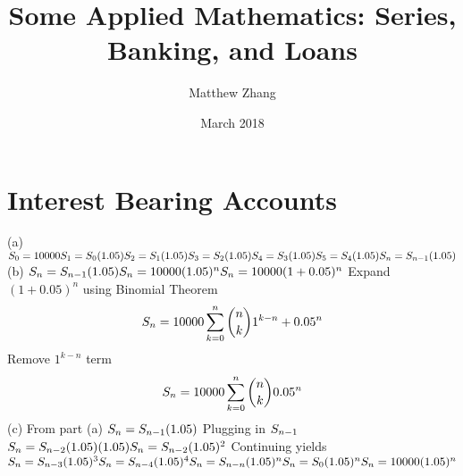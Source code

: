 \documentclass{article}
\title{Some Applied Mathematics: Series, Banking, and Loans}
\author{Matthew Zhang}
\date{March 2018}
\begin{document}
\maketitle


\section*{Interest Bearing Accounts}
(a)\newline
$S_0=10000\newline
S_1= S_0(1.05)\newline
S_2 = S_1(1.05)\newline
S_3 = S_2(1.05)\newline
S_4 = S_3(1.05)\newline
S_5 = S_4(1.05)\newline 
S_n = S_{n-1}(1.05)\newline$
\linebreak 
\linebreak 
(b)\newline
$
S_n = S_{n-1}(1.05)\newline
S_n = 10000(1.05)^n\newline
S_n = 10000(1+ 0.05)^n\newline
$
Expand $(1+ 0.05)^n$ using Binomial Theorem \newline
$$
S_n = 10000\sum_{k=0}^{n} {{n \choose k} 1^{k-n}+0.05^n}\newline
$$
Remove $1^{k-n}$ term\newline
$$
S_n = 10000\sum_{k=0}^{n} {{n \choose k} 0.05^n}\newline
$$
(c)\newline
From part (a)
$S_n = S_{n-1}(1.05)\newline$
\newline
Plugging in $S_{n-1}\newline$
$S_n = S_{n-2}(1.05)(1.05) \newline
S_n = S_{n-2}(1.05)^2 \newline
$
\newline
Continuing yields \newline
$S_n = S_{n-3}(1.05)^3 \newline
S_n = S_{n-4}(1.05)^4 \newline
S_n = S_{n-n}(1.05)^n \newline
S_n = S_{0}(1.05)^n \newline
S_n = 10000(1.05)^n \newline
$
\end{document}
